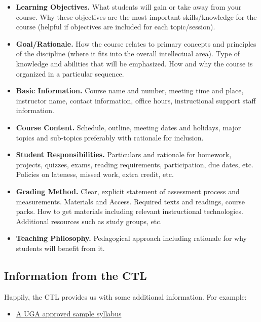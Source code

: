 \begin{itemize}
\item \textbf{Learning Objectives.} What students will gain or take away from your course. Why these objectives are the most important skills/knowledge for the course (helpful if objectives are included for each topic/session).
  
\item \textbf{Goal/Rationale.} How the course relates to primary concepts and principles of the discipline (where it fits into the overall intellectual area). Type of knowledge and abilities that will be emphasized. How and why the course is organized in a particular sequence.

\item \textbf{Basic Information.} Course name and number, meeting time and place, instructor name, contact information, office hours, instructional support staff information.

\item \textbf{Course Content.} Schedule, outline, meeting dates and holidays, major topics and sub-topics preferably with rationale for inclusion.
  
\item \textbf{Student Responsibilities.} Particulars and rationale for homework, projects, quizzes, exams, reading requirements, participation, due dates, etc. Policies on lateness, missed work, extra credit, etc.

\item \textbf{Grading Method.} Clear, explicit statement of assessment process and measurements.
  Materials and Access. Required texts and readings, course packs. How to get materials including relevant instructional technologies. Additional resources such as study groups, etc.
  
\item \textbf{Teaching Philosophy.} Pedagogical approach including rationale for why students will benefit from it.
\end{itemize}

\subsection{Information from the CTL}
\label{sec:information-from-ctl}

Happily, the CTL provides us with some additional information.  For example:
\begin{itemize}
\item \href{https://github.com/WilliamOlsen/GRSC-2018/blob/master/Lectures/Week-2/UGA-Syllabus-Template-Instructors-of-GRSC7770.pdf}{A UGA approved sample syllabus}
\end{itemize}


